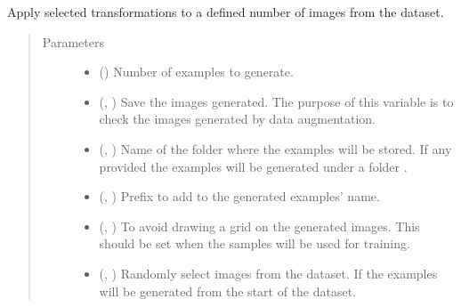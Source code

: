 \documentclass[letterpaper,10pt,english]{sphinxmanual}
\begin{document}
\begin{fulllineitems}
\begin{fulllineitems}
\label{\detokenize{data/generators/2d_generator:data.generators.data_2D_generator.ImageDataGenerator.get_transformed_samples}}
Apply selected transformations to a defined number of images from the dataset.
\begin{quote}\begin{description}
\item[{Parameters}] \leavevmode\begin{itemize}
\item {} 
 () \textendash{} Number of examples to generate.

\item {} 
 (, ) \textendash{} Save the images generated. The purpose of this variable is to check the images generated by data
augmentation.

\item {} 
 (, ) \textendash{} Name of the folder where the examples will be stored. If any provided the examples will be generated
under a folder .

\item {} 
 (, ) \textendash{} Prefix to add to the generated examples’ name.

\item {} 
 (, ) \textendash{} To avoid drawing a grid on the generated images. This should be set when the samples will be used for
training.

\item {} 
 (, ) \textendash{} Randomly select images from the dataset. If  the examples will be generated from the start of
the dataset.


\end{itemize}
\end{description}
\end{quote}
\end{fulllineitems}
\end{fulllineitems}
\end{document}
